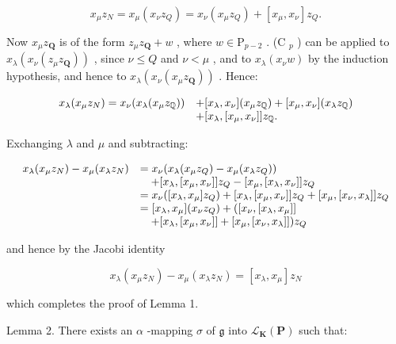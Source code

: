 \[
x _ {\mu} z _ {N} = x _ {\mu} (x _ {\nu} z _ {Q}) = x _ {\nu} (x _ {\mu} z _ {Q}) + [ x _ {\mu}, x _ {\nu} ] z _ {Q}.
\]

Now \(x_{\mu}z_{\mathbf{Q}}\) is of the form \(z_{\mu}z_{\mathbf{Q}} + w\) , where \(w\in \mathrm{P}_{p - 2}\) . (C \(_{p}\) ) can be applied to \(x_{\lambda}(x_{\nu}(z_{\mu}z_{\mathbf{Q}}))\) , since \(\nu \leqslant Q\) and \(\nu < \mu\) , and to \(x_{\lambda}(x_{\nu}w)\) by the induction hypothesis, and hence to \(x_{\lambda}(x_{\nu}(x_{\mu}z_{\mathbf{Q}}))\) . Hence:

\[
\begin{array}{r l} x _ {\lambda} (x _ {\mu} z _ {N}) = x _ {\nu} (x _ {\lambda} (x _ {\mu} z _ {\mathbb {Q}})) & + [ x _ {\lambda}, x _ {\nu} ] (x _ {\mu} z _ {\mathbb {Q}}) + [ x _ {\mu}, x _ {\nu} ] (x _ {\lambda} z _ {\mathbb {Q}}) \\ & + [ x _ {\lambda}, [ x _ {\mu}, x _ {\nu} ] ] z _ {\mathbb {Q}}. \end{array}
\]

Exchanging \(\lambda\) and \(\mu\) and subtracting:

\[
\begin{array}{r l} {x _ {\lambda} (x _ {\mu} z _ {N}) - x _ {\mu} (x _ {\lambda} z _ {N})} & {= x _ {\nu} (x _ {\lambda} (x _ {\mu} z _ {Q}) - x _ {\mu} (x _ {\lambda} z _ {Q}))} \\ & {\quad + [ x _ {\lambda}, [ x _ {\mu}, x _ {\nu} ] ] z _ {Q} - [ x _ {\mu}, [ x _ {\lambda}, x _ {\nu} ] ] z _ {Q}} \\ & {= x _ {\nu} ([ x _ {\lambda}, x _ {\mu} ] z _ {Q}) + [ x _ {\lambda}, [ x _ {\mu}, x _ {\nu} ] ] z _ {Q} + [ x _ {\mu}, [ x _ {\nu}, x _ {\lambda} ] ] z _ {Q}} \\ & {= [ x _ {\lambda}, x _ {\mu} ] (x _ {\nu} z _ {Q}) + ([ x _ {\nu}, [ x _ {\lambda}, x _ {\mu} ] ]} \\ & {\quad + [ x _ {\lambda}, [ x _ {\mu}, x _ {\nu} ] ] + [ x _ {\mu}, [ x _ {\nu}, x _ {\lambda} ] ]) z _ {Q}} \end{array}
\]

and hence by the Jacobi identity

\[
x _ {\lambda} (x _ {\mu} z _ {N}) - x _ {\mu} (x _ {\lambda} z _ {N}) = [ x _ {\lambda}, x _ {\mu} ] z _ {N}
\]

which completes the proof of Lemma 1.

Lemma 2. There exists an \(\alpha\) -mapping \(\sigma\) of \(\mathfrak{g}\) into \(\mathcal{L}_{\mathbf{K}}(\mathbf{P})\) such that:

